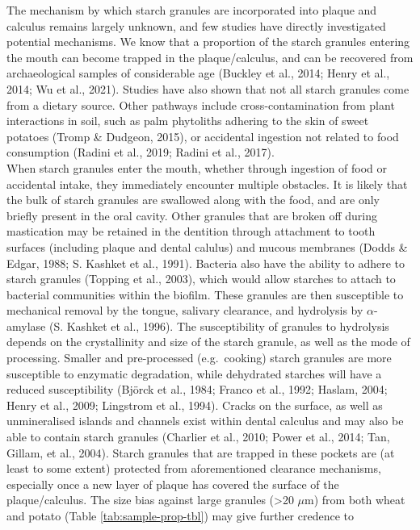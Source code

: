 \documentclass[
]{article}
\begin{document}
The mechanism by which starch granules are incorporated into plaque and calculus
remains largely unknown, and few studies have directly investigated potential
mechanisms. We know that a proportion of the starch granules entering
the mouth can become trapped in the plaque/calculus, and can be recovered from
archaeological samples of considerable age
(Buckley et al., 2014; Henry et al., 2014; Wu et al., 2021).
Studies have also shown that not all starch granules come from a dietary source.
Other pathways include cross-contamination from plant interactions in soil, such
as palm phytoliths adhering to the skin of sweet potatoes
(Tromp \& Dudgeon, 2015),
or accidental ingestion not related to food consumption
(Radini et al., 2019; Radini et al., 2017).\\
When starch granules enter the mouth, whether through ingestion of food or accidental
intake, they immediately encounter multiple obstacles. It is likely
that the bulk of starch granules are swallowed along with the food, and are
only briefly present in the oral cavity. Other granules that are broken off
during mastication may be retained in the dentition through attachment to
tooth surfaces (including plaque and dental calulus) and mucous membranes
(Dodds \& Edgar, 1988; S. Kashket et al., 1991).
Bacteria also have the ability to adhere to starch granules
(Topping et al., 2003),
which would allow starches to attach to bacterial communities within the biofilm.
These granules are then
susceptible to mechanical removal by the tongue, salivary clearance, and hydrolysis
by \(\alpha\)-amylase (S. Kashket et al., 1996).
The susceptibility of granules to hydrolysis depends on the crystallinity and size
of the starch granule, as well as the mode of processing. Smaller and pre-processed
(e.g.~cooking) starch granules are more susceptible to enzymatic degradation,
while dehydrated starches will have a reduced susceptibility
(Björck et al., 1984; Franco et al., 1992; Haslam, 2004; Henry et al., 2009; Lingstrom et al., 1994).
Cracks on the surface, as well as unmineralised islands and channels exist within
dental calculus and may also be able to contain starch granules
(Charlier et al., 2010; Power et al., 2014; Tan, Gillam, et al., 2004).
Starch granules that are trapped in these pockets are (at least to some extent)
protected from aforementioned clearance mechanisms, especially once
a new layer of plaque has covered the surface of the plaque/calculus.
The size bias against large granules (\textgreater20 \(\mu\)m) from both wheat and potato
(Table \ref{tab:sample-prop-tbl}) may give further credence to
\end{document}
